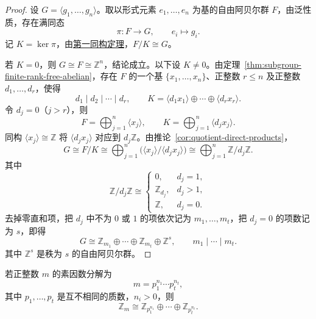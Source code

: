 \begin{proof}
设 $G=\langle g_1,\ldots,g_n\rangle$。取以形式元素 $e_1,\ldots,e_n$ 为基的自由阿贝尔群 $F$，由泛性质，存在满同态
\[
  \pi:F\longrightarrow G,\qquad e_i\longmapsto g_i.
\]
记 $K=\ker\pi$，由\hyperref[cor:first-isomorphism]{第一同构定理}，$F/K\cong G$。

若 $K=0$，则 $G\cong F\cong\mathbb Z^n$，结论成立。以下设 $K\ne0$。由定理~\ref{thm:subgroup-finite-rank-free-abelian}，存在 $F$ 的一个基 $\{x_1,\ldots,x_n\}$、正整数 $r\leq n$ 及正整数 $d_1,\ldots,d_r$，使得
\[
  d_1\mid d_2\mid\cdots\mid d_r,\qquad
  K=\langle d_1x_1\rangle\oplus\cdots\oplus\langle d_rx_r\rangle.
\]
令 $d_j=0$（$j>r$），则
\[
  F=\bigoplus_{j=1}^{n}\langle x_j\rangle,\qquad
  K=\bigoplus_{j=1}^{n}\langle d_jx_j\rangle.
\]
同构 $\langle x_j\rangle\cong\mathbb Z$ 将 $\langle d_jx_j\rangle$ 对应到 $d_j\mathbb Z$。由推论~\ref{cor:quotient-direct-products}，
\[
  G\cong F/K
  \cong\bigoplus_{j=1}^{n}
       \bigl(\langle x_j\rangle/\langle d_jx_j\rangle\bigr)
  \cong\bigoplus_{j=1}^{n}\mathbb Z/d_j\mathbb Z.
\]
其中
\[
  \mathbb Z/d_j\mathbb Z\cong
  \begin{cases}
    0,&d_j=1,\\
    \mathbb Z_{d_j},&d_j>1,\\
    \mathbb Z,&d_j=0.
  \end{cases}
\]
去掉零直和项，把 $d_j$ 中不为 $0$ 或 $1$ 的项依次记为 $m_1,\ldots,m_t$，把 $d_j=0$ 的项数记为 $s$，即得
\[
  G\cong\mathbb Z_{m_1}\oplus\cdots\oplus\mathbb Z_{m_t}
       \oplus\mathbb Z^s,
  \qquad m_1\mid\cdots\mid m_t.
\]
其中 $\mathbb Z^s$ 是秩为 $s$ 的自由阿贝尔群。
\end{proof}

\begin{lemma}\label{lem:cyclic-prime-power-decomposition}
若正整数 $m$ 的素因数分解为
\[
  m=p_1^{n_1}\cdots p_t^{n_t},
\]
其中 $p_1,\ldots,p_t$ 是互不相同的质数，$n_i>0$，则
\[
  \mathbb Z_m\cong
  \mathbb Z_{p_1^{n_1}}\oplus\cdots\oplus\mathbb Z_{p_t^{n_t}}.
\]
\end{lemma}

